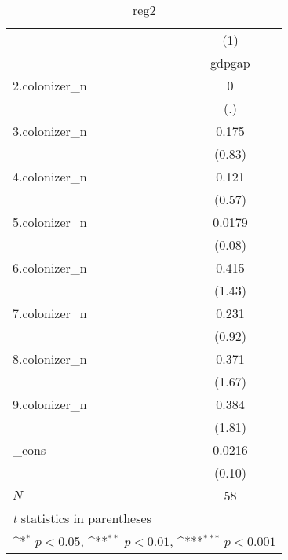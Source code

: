 \begin{table}[htbp]\centering
\def\sym#1{\ifmmode^{#1}\else\(^{#1}\)\fi}
\caption{reg2}
\begin{tabular}{l*{1}{c}}
\hline\hline
            &\multicolumn{1}{c}{(1)}\\
            &\multicolumn{1}{c}{gdpgap}\\
\hline
2.colonizer\_n&           0         \\
            &         (.)         \\
[1em]
3.colonizer\_n&       0.175         \\
            &      (0.83)         \\
[1em]
4.colonizer\_n&       0.121         \\
            &      (0.57)         \\
[1em]
5.colonizer\_n&      0.0179         \\
            &      (0.08)         \\
[1em]
6.colonizer\_n&       0.415         \\
            &      (1.43)         \\
[1em]
7.colonizer\_n&       0.231         \\
            &      (0.92)         \\
[1em]
8.colonizer\_n&       0.371         \\
            &      (1.67)         \\
[1em]
9.colonizer\_n&       0.384         \\
            &      (1.81)         \\
[1em]
\_cons      &      0.0216         \\
            &      (0.10)         \\
\hline
\(N\)       &          58         \\
\hline\hline
\multicolumn{2}{l}{\footnotesize \textit{t} statistics in parentheses}\\
\multicolumn{2}{l}{\footnotesize \sym{*} \(p<0.05\), \sym{**} \(p<0.01\), \sym{***} \(p<0.001\)}\\
\end{tabular}
\end{table}
